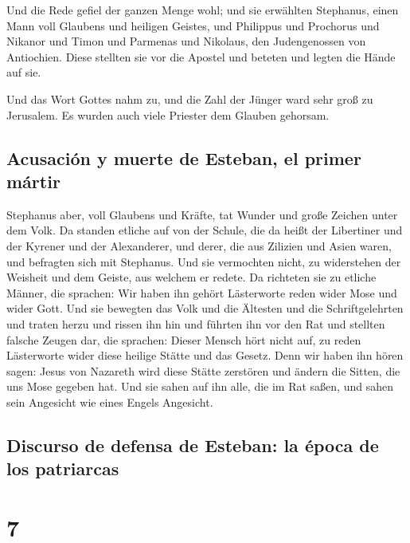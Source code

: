  Und die Rede gefiel der ganzen Menge wohl; und sie
erwählten Stephanus, einen Mann voll Glaubens und heiligen Geistes, und
Philippus und Prochorus und Nikanor und Timon und Parmenas und Nikolaus,
den Judengenossen von Antiochien.  Diese stellten sie vor
die Apostel und beteten und legten die Hände auf sie.

 Und das Wort Gottes nahm zu, und die Zahl der Jünger ward
sehr groß zu Jerusalem. Es wurden auch viele Priester dem Glauben
gehorsam.

\hypertarget{acusaciuxf3n-y-muerte-de-esteban-el-primer-muxe1rtir}{%
\subsection{Acusación y muerte de Esteban, el primer
mártir}\label{acusaciuxf3n-y-muerte-de-esteban-el-primer-muxe1rtir}}

 Stephanus aber, voll Glaubens und Kräfte, tat Wunder und
große Zeichen unter dem Volk.  Da standen etliche auf von
der Schule, die da heißt der Libertiner und der Kyrener und der
Alexanderer, und derer, die aus Zilizien und Asien waren, und befragten
sich mit Stephanus.  Und sie vermochten nicht, zu
widerstehen der Weisheit und dem Geiste, aus welchem er redete.
 Da richteten sie zu etliche Männer, die sprachen: Wir
haben ihn gehört Lästerworte reden wider Mose und wider Gott.
 Und sie bewegten das Volk und die Ältesten und die
Schriftgelehrten und traten herzu und rissen ihn hin und führten ihn vor
den Rat  und stellten falsche Zeugen dar, die sprachen:
Dieser Mensch hört nicht auf, zu reden Lästerworte wider diese heilige
Stätte und das Gesetz.  Denn wir haben ihn hören sagen:
Jesus von Nazareth wird diese Stätte zerstören und ändern die Sitten,
die uns Mose gegeben hat.  Und sie sahen auf ihn alle,
die im Rat saßen, und sahen sein Angesicht wie eines Engels Angesicht.

\hypertarget{discurso-de-defensa-de-esteban-la-uxe9poca-de-los-patriarcas}{%
\subsection{Discurso de defensa de Esteban: la época de los
patriarcas}\label{discurso-de-defensa-de-esteban-la-uxe9poca-de-los-patriarcas}}

\hypertarget{section-6}{%
\section{7}\label{section-6}}

